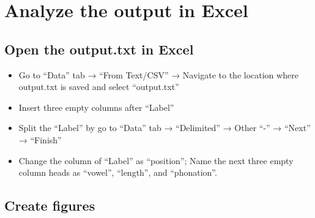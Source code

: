 \documentclass[
]{article}
\providecommand{\tightlist}{%
  \setlength{\itemsep}{0pt}\setlength{\parskip}{0pt}}
\begin{document}
\hypertarget{analyze-the-output-in-excel}{%
\section{Analyze the output in
Excel}\label{analyze-the-output-in-excel}}

\hypertarget{open-the-output.txt-in-excel}{%
\subsection{Open the output.txt in
Excel}\label{open-the-output.txt-in-excel}}

\begin{itemize}
\tightlist
\item
  Go to ``Data'' tab → ``From Text/CSV'' → Navigate to the location
  where output.txt is saved and select ``output.txt''
\item
  Insert three empty columns after ``Label''
\item
  Split the ``Label'' by go to ``Data'' tab → ``Delimited'' → Other
  ``-'' → ``Next'' → ``Finish''
\item
  Change the column of ``Label'' as ``position''; Name the next three
  empty column heads as ``vowel'', ``length'', and ``phonation''.
\end{itemize}

\hypertarget{create-figures}{%
\subsection{Create figures}\label{create-figures}}
\end{document}
